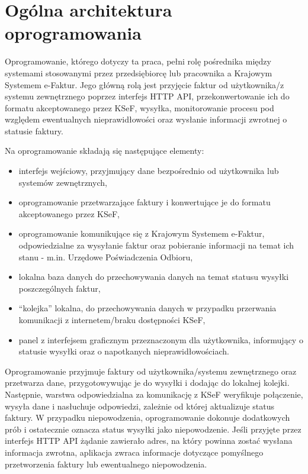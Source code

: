 \section{Ogólna architektura oprogramowania}
Oprogramowanie, którego dotyczy ta praca, pełni rolę pośrednika między systemami stosowanymi przez przedsiębiorcę lub pracownika a Krajowym Systemem e-Faktur. Jego główną rolą jest przyjęcie faktur od użytkownika/z systemu zewnętrznego poprzez interfejs HTTP API, przekonwertowanie ich do formatu akceptowanego przez KSeF, wysyłka, monitorowanie procesu pod względem ewentualnych nieprawidłowości oraz wysłanie informacji zwrotnej o statusie faktury.
\par
Na oprogramowanie składają się następujące elementy:
\begin{itemize}
    \setlength{\itemsep}{-3pt}
    \setlength{\parsep}{0pt}
    \setlength{\topsep}{6pt}
    \item interfejs wejściowy, przyjmujący dane bezpośrednio od użytkownika lub systemów zewnętrznych,
    \item oprogramowanie przetwarzające faktury i konwertujące je do formatu akceptowanego przez KSeF,
    \item oprogramowanie komunikujące się z Krajowym Systemem e-Faktur, odpowiedzialne za wysyłanie faktur oraz pobieranie informacji na temat ich stanu - m.in. Urzędowe Poświadczenia Odbioru,
    \item lokalna baza danych do przechowywania danych na temat statusu wysyłki poszczególnych faktur,
    \item \enquote{kolejka} lokalna, do przechowywania danych w przypadku przerwania komunikacji z internetem/braku dostępności KSeF,
    \item panel z interfejsem graficznym przeznaczonym dla użytkownika, informujący o statusie wysyłki oraz o napotkanych nieprawidłowościach.
\end{itemize}

Oprogramowanie przyjmuje faktury od użytkownika/systemu zewnętrznego oraz przetwarza dane, przygotowywując je do wysyłki i dodając do lokalnej kolejki. Następnie, warstwa odpowiedzialna za komunikację z KSeF weryfikuje połączenie, wysyła dane i nasłuchuje odpowiedzi, zależnie od której aktualizuje status faktury. W przypadku niepowodzenia, oprogramowanie dokonuje dodatkowych prób i ostatecznie oznacza status wysyłki jako niepowodzenie. Jeśli przyjęte przez interfejs HTTP API żądanie zawierało adres, na który powinna zostać wysłana informacja zwrotna, aplikacja zwraca informacje dotyczące pomyślnego przetworzenia faktury lub ewentualnego niepowodzenia.
